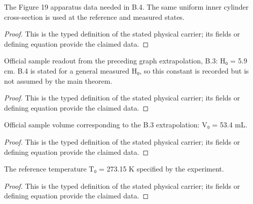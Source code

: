 \begin{definition}
  \label{def:physics:IPhO_2026_4_B_4:aux007}
  The Figure 19 apparatus data needed in B.4. The same uniform inner cylinder cross-section is used at the reference and measured states.
\end{definition}
\begin{proof}
  This is the typed definition of the stated physical carrier; its fields or defining equation provide the claimed data.
\end{proof}

\begin{definition}
  \label{def:physics:IPhO_2026_4_B_4:aux008}
  Official sample readout from the preceding graph extrapolation, B.3: H₀ = 5.9 cm. B.4 is stated for a general measured H₀, so this constant is recorded but is not assumed by the main theorem.
\end{definition}
\begin{proof}
  This is the typed definition of the stated physical carrier; its fields or defining equation provide the claimed data.
\end{proof}

\begin{definition}
  \label{def:physics:IPhO_2026_4_B_4:aux009}
  Official sample volume corresponding to the B.3 extrapolation: V₀ = 53.4 mL.
\end{definition}
\begin{proof}
  This is the typed definition of the stated physical carrier; its fields or defining equation provide the claimed data.
\end{proof}

\begin{definition}
  \label{def:physics:IPhO_2026_4_B_4:aux010}
  The reference temperature T₀ = 273.15 K specified by the experiment.
\end{definition}
\begin{proof}
  This is the typed definition of the stated physical carrier; its fields or defining equation provide the claimed data.
\end{proof}

